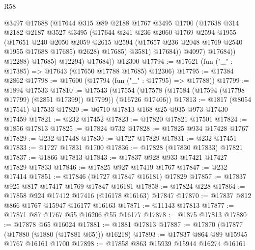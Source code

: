 \begin{lexlean}{R58}
\begin{coremodule}
                      @3497
                      @17688
                      (@17644
                        @315
                        @89
                        @2188
                        @1767
                        @3495
                        @1700
                        (@17638
                          @314
                          @2182
                          @2187
                          @3527
                          @3495
                          (@17644
                            @241
                            @236
                            @2060
                            @1769
                            @2594
                            @1955
                            (@17651
                              @240
                              @2050
                              @2059
                              @2615
                              @2594
                              (@17657 @236 @2048 @1769 @2540 @1955 @17688 @17685)
                              @2628)
                            @17685)
                          @3581)
                        @17684))
                    @4097)
                  @17684))
              @12288)
            @17685)
          @12294)
        @17684))
    @12300
@17794 := @17621 (fun ("_" : @17385) => @17643 (@17650 @17788 @17685) @12306)
@17795 := @17384 @2862
@17798 := @17600 (@17794 (fun ("_" : @17795) => @17788))
@17799 := @1894 @17533
@17810 := @17543
    (@17554 (@17578 (@17584 (@17594 (@17798 @17799) (@2851 @17399)) @17799)) (@16726 @17406))
@17813 := @1817 (@8054 @17541) @17533
@17820 := @6710 @17813 @168 @25 @935 @973 @17430 @17459
@17821 := @232 @17452
@17823 := @17820 @17821 @17501
@17824 := @1856 @17813
@17825 := @17824 @732
@17828 := @17825 @934 @17428 @1767
@17829 := @232 @17448
@17830 := @1727 @17829
@17831 := @232 @17451
@17833 := @1727 @17831 @1700
@17836 := @17828 (@17830 @17833) @17821
@17837 := @1866 @17813
@17843 := @17837 @928 @933 @17421 @17427 @17829 @17833
@17846 := @17825 @927 @17419 @1767
@17847 := @232 @17414
@17851 := @17846 (@1727 @17847 @16181) @17829
@17857 := @17837 @925 @817 @17417 @1769 @17847 @16181
@17858 := @17824 @228
@17864 := @17858 @924 @17412 @17416 (@16178 @16163) @17847
@17870 := @17837 @812 @866 @1767 @15947 @16177 @16163
@17871 := @11143 @17813
@17877 := @17871 @87 @1767 @55 @16206 @55 @16177
@17878 := @1875 @17813
@17880 := @17878 @65 @16024
@17881 := @1881 @17813
@17887 := @17870 (@17877 (@17880 (@1880 (@17881 @65))) @16218)
@17893 := @17837 @864 @89 @15945 @1767 @16161 @1700
@17898 := @17858 @863 @15939 @15944 @16274 @16161

\end{coremodule}
\end{lexlean}
